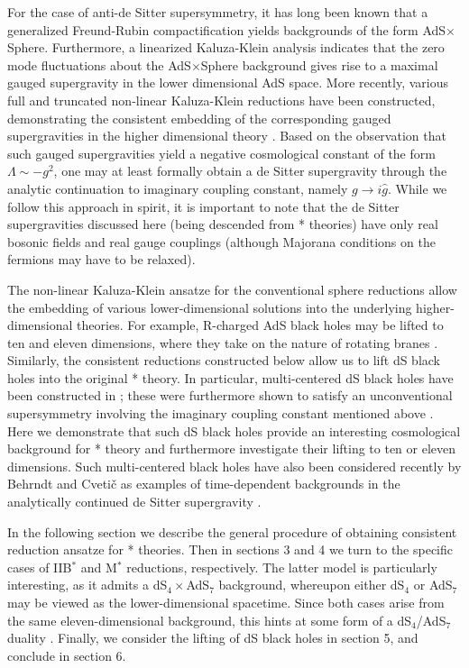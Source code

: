 \documentclass[a4paper,12pt]{article}
\begin{document}
For the case of anti-de Sitter supersymmetry, it has long been known
that a generalized Freund-Rubin compactification yields backgrounds of
the form AdS$\times$Sphere.  Furthermore, a linearized Kaluza-Klein
analysis indicates that the zero mode fluctuations about the
AdS$\times$Sphere background gives rise to a maximal gauged supergravity
in the lower dimensional AdS space.  More recently, various full and
truncated non-linear Kaluza-Klein reductions have been constructed,
demonstrating the consistent embedding of the corresponding gauged
supergravities in the higher dimensional theory
\cite{deWit,Cvetic,Nastase:1999cb,Nastase,Lu:1999bc,Lu:1999bw,Cvetic:1999au,Cvetic:1999xx,Cvetic:2000eb,Cvetic2,Cvetic:2000dm}.
Based on the observation that such gauged supergravities yield a
negative cosmological constant of the form $\Lambda\sim-g^2$, one may at
least formally obtain a de Sitter supergravity through the analytic
continuation to imaginary coupling constant, namely $g\to i\hat g$.
While we follow this approach in spirit, it is important to note that
the de Sitter supergravities discussed here (being descended from *
theories) have only real bosonic fields and real gauge couplings
(although Majorana conditions on the fermions may have to be relaxed).

The non-linear Kaluza-Klein ansatze for the conventional sphere reductions
allow the embedding of various lower-dimensional solutions into the
underlying higher-dimensional theories.  For example, R-charged AdS black
holes may be lifted to ten and eleven dimensions, where they take on the
nature of rotating branes \cite{Cvetic}.  Similarly, the consistent
reductions constructed below allow us to lift dS black holes into the
original * theory.  In particular, multi-centered dS black holes have been
constructed in \cite{Kastor:1992nn,London}; these were furthermore
shown to satisfy an unconventional supersymmetry involving the imaginary
coupling constant mentioned above \cite{London,Liu}.  Here we demonstrate
that such dS black holes provide an interesting cosmological background for
* theory and furthermore investigate their lifting to ten or eleven dimensions.
Such multi-centered black holes have also been considered recently by
Behrndt and Cveti\v{c} as examples of time-dependent backgrounds in the
analytically continued de Sitter supergravity \cite{Behrndt}.

In the following section we describe the general procedure of obtaining
consistent reduction ansatze for * theories.  Then in sections 3 and 4
we turn to the specific cases of IIB$^*$ and M$^*$ reductions,
respectively.  The latter model is particularly interesting, as it
admits a dS$_4\times$AdS$_7$ background, whereupon either dS$_4$ or
AdS$_7$ may be viewed as the lower-dimensional spacetime.  Since both
cases arise from the same eleven-dimensional background, this hints at
some form of a dS$_4$/AdS$_7$ duality \cite{Batrachenko:2002pu}.  Finally,
we consider the
lifting of dS black holes in section 5, and conclude in section 6.
\end{document}

